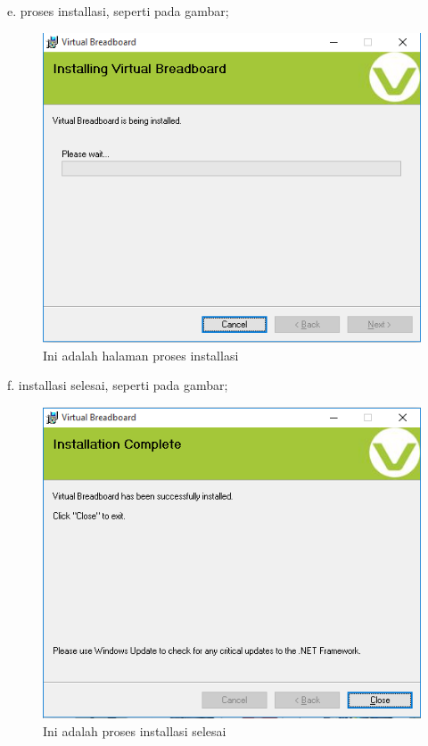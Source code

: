    e. proses installasi, seperti pada gambar;
\begin{figure}[ht]
  \centerline{\includegraphics[width=.75\textwidth]{figures/prosesinstallasi.png}}
  \caption{Ini adalah halaman proses installasi}
  \label{fig:prosesinstallasi}
  \end{figure}
    f. installasi selesai, seperti pada gambar;
\begin{figure}[ht]
  \centerline{\includegraphics[width=.75\textwidth]{figures/installasiselesai.png}}
  \caption{Ini adalah proses installasi selesai}
  \label{fig:installasiselesai}
  \end{figure}
  

